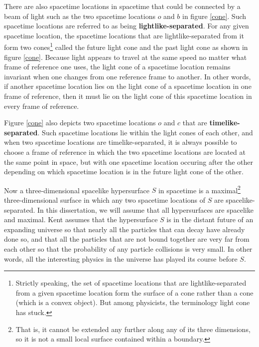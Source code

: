 \documentclass[12pt]{report}
\providecommand{\DIFadd}[1]{{\protect\color{blue}\uwave{#1}}} %
\providecommand{\DIFaddbegin}{} %
\providecommand{\DIFaddend}{} %
\begin{document}
There are also \DIFaddbegin \DIFadd{distinct }\DIFaddend spacetime locations in spacetime that could be connected by a beam of light such as the two spacetime locations $o$ and $b$ in figure \ref{cone}. Such spacetime locations are referred to as being \textbf{lightlike-separated}. For any given spacetime location, the spacetime locations that are lightlike-separated from it form two cones\footnote{Strictly speaking, the set of spacetime locations that are lightlike-separated from a given spacetime location form the surface of a cone rather than a cone (which is a convex object). But among physicists, the terminology light cone has stuck.} called the future light cone and the past light cone as shown in figure \ref{cone}. Because light appears to travel at the same speed no matter what frame of reference one uses, the light cone of a spacetime location remains invariant when one changes from one reference frame to another. In other words, if another spacetime location lies on the light cone of a spacetime location in one frame of reference, then it must lie on the light cone of this spacetime location in every frame of reference. 

Figure \ref{cone} also depicts two spacetime locations $o$ and $c$ that are \textbf{timelike-separated}. Such spacetime locations lie within the light cones of each other, and when two spacetime locations are timelike-separated, it is always possible to choose a frame of reference in which the two spacetime locations are located at the same point in space, but with one spacetime location occuring after the other  depending on which spacetime location is in  the future light cone of the other. 

Now a three-dimensional spacelike hypersurface $S$ in spacetime is a maximal\footnote{That is, it cannot be extended any further along any of its three dimensions, so it is not a small local surface contained within a boundary.} three-dimensional surface in which any two spacetime locations of $S$ are spacelike-separated. In this dissertation, we will assume that all hypersurfaces are spacelike and maximal.
Kent assumes that the hypersurface $S$ is in the distant future of an expanding universe so that nearly all the particles that can decay have already done so, and that all the particles that are not bound together are very far from each other so that the probability of any particle collisions is very small. In other words, all the interesting physics in the universe has played its course before $S$.
\end{document}
